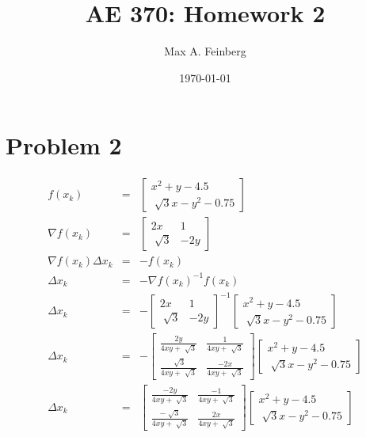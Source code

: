 \documentclass[a4paper]{article}
\title{AE 370: Homework 2}
\author{Max A. Feinberg}
\date{\AdvanceDate[-1]\today}
\begin{document}
\maketitle


\section*{Problem 2}

\begin{eqnarray*}
f(x_{k}) & = & \begin{bmatrix}
x^{2} + y - 4.5 \\
\sqrt[]{3} x - y^{2} - 0.75
\end{bmatrix}\\
\nabla f(x_{k}) & = & \begin{bmatrix}
2x & 1 \\
\sqrt[]{3} & -2y
\end{bmatrix}\\
\nabla f(x_{k}) \Delta x_{k} & = & -f(x_{k})\\
\Delta x_{k} & = & -\nabla f(x_{k})^{-1} f(x_{k})\\
\Delta x_{k} & = & -\begin{bmatrix}
2x & 1 \\
\sqrt[]{3} & -2y
\end{bmatrix}^{-1}
\begin{bmatrix}
x^{2} + y - 4.5 \\
\sqrt[]{3} x - y^{2} - 0.75
\end{bmatrix}\\
\Delta x_{k} & = & -\begin{bmatrix}
\frac{2y}{4xy + \sqrt[]{3}} & \frac{1}{4xy + \sqrt[]{3}} \\
\frac{\sqrt[]{3}}{4xy + \sqrt[]{3}} & \frac{-2x}{4xy + \sqrt[]{3}}
\end{bmatrix}
\begin{bmatrix}
x^{2} + y - 4.5 \\
\sqrt[]{3} x - y^{2} - 0.75
\end{bmatrix}\\
\Delta x_{k} & = & \begin{bmatrix}
\frac{-2y}{4xy + \sqrt[]{3}} & \frac{-1}{4xy + \sqrt[]{3}} \\
\frac{-\sqrt[]{3}}{4xy + \sqrt[]{3}} & \frac{2x}{4xy + \sqrt[]{3}}
\end{bmatrix}
\begin{bmatrix}
x^{2} + y - 4.5 \\
\sqrt[]{3} x - y^{2} - 0.75
\end{bmatrix}\\

\end{eqnarray*}
\end{document}
